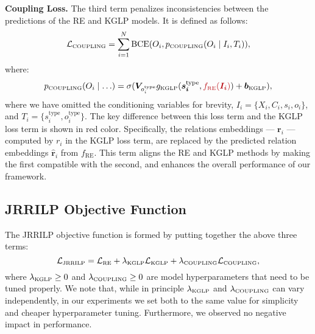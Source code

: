 \textbf{Coupling Loss.}
The third term penalizes inconsistencies between the predictions of the RE and KGLP models.
It is defined as follows:
\begin{equation}
    \mathcal{L}_{\textrm{\tiny COUPLING}} = \sum_{i=1}^N \textrm{BCE}(O_i, p_{\textrm{\tiny COUPLING}}(O_i \mid I_i, T_i)),
\end{equation}
where:
\begin{equation}
    p_{\textrm{\tiny COUPLING}}(O_i \mid \hdots) =
   \sigma(\bm{V}_{o^{\textrm{type}}_i} g_{\textrm{\tiny KGLP}}(\bm{s^{\textrm{type}}_i}, \textcolor{our_red}{f_{\textrm{\tiny RE}}(\bm{I_i})}) + \bm{b}_{\textrm{\tiny KGLP}}),
\end{equation}
where we have omitted the conditioning variables for brevity, $I_i= \{X_i, C_i, s_i, o_i\}$, and $T_i=\{s^{\textrm{type}}_i, o^{\textrm{type}}_i\}$.
The key difference between this loss term and the KGLP loss term is shown in \textcolor{our_red}{red} color.
Specifically, the relations embeddings --- $\bm{r}_i$ --- computed by $r_i$ in the KGLP loss term, are replaced by the predicted relation embeddings $\hat{\mathbf{r}}_i$ from $f_{\textrm{RE}}$.
This term aligns the RE and KGLP methods by making the first compatible with the second, and enhances the overall performance of our framework.

\subsection{JRRILP Objective Function}

The JRRILP objective function is formed by putting together the above three terms:
\begin{equation}
    \mathcal{L}_{\textrm{\tiny JRRILP}} = \mathcal{L}_{\textrm{\tiny RE}} + \lambda_{\textrm{\tiny KGLP}} \mathcal{L}_{\textrm{\tiny KGLP}} + \lambda_{\textrm{\tiny COUPLING}} \mathcal{L}_{\textrm{\tiny COUPLING}},\label{eq:JRRILP}
\end{equation}
where $\lambda_{\textrm{\tiny KGLP}} \geq 0$ and $\lambda_{\textrm{\tiny COUPLING}} \geq 0$ are model hyperparameters that need to be tuned properly.
We note that, while in principle $\lambda_{\textrm{\tiny KGLP}}$ and $\lambda_{\textrm{\tiny COUPLING}}$ can vary independently, in our experiments we set both to the same value for simplicity and cheaper hyperparameter tuning. Furthermore, we observed no negative impact in performance.

